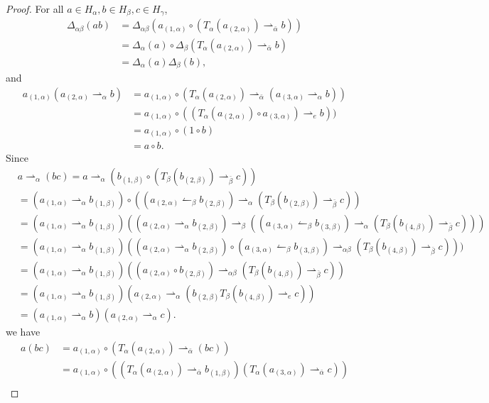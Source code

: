 \documentclass[11pt]{article}
\def\a{\alpha}
\def\b{\beta}
\def\g{\gamma}
\begin{document}
\begin{proof}
For all $a\in H_\a,b\in H_\b,c\in H_\g$,
\begin{align*}
\Delta_{\a\b}(ab)&=\Delta_{\a\b}(a_{(1,\a)}\circ(T_\a(a_{(2,\a)})\rightharpoonup_{\bar{\a}}b))\\
&=\Delta_\a(a)\circ\Delta_\b(T_\a(a_{(2,\a)})\rightharpoonup_{\bar{\a}}b)\\
&=\Delta_\a(a)\Delta_\b(b),
\end{align*}
and
\begin{align*}
a_{(1,\a)}(a_{(2,\a)}\rightharpoonup_{\a}b)&=a_{(1,\a)}\circ(T_\a(a_{(2,\a)})\rightharpoonup_{\bar{\a}}(a_{(3,\a)}\rightharpoonup_{\a}b))\\
&=a_{(1,\a)}\circ((T_\a(a_{(2,\a)})\circ a_{(3,\a)})\rightharpoonup_{e}b))\\
&=a_{(1,\a)}\circ(1\circ b)\\
&=a\circ b.
\end{align*}
Since
\begin{align*}
&a\rightharpoonup_\a(bc)=a\rightharpoonup_\a(b_{(1,\b)}\circ(T_\b(b_{(2,\b)})\rightharpoonup_{\bar{\b}}c))\\
&=(a_{(1,\a)}\rightharpoonup_\a b_{(1,\b)})\circ((a_{(2,\a)}\leftharpoonup_\b b_{(2,\b)})\rightharpoonup_\a(T_\b(b_{(2,\b)})\rightharpoonup_{\bar{\b}}c))\\
&=(a_{(1,\a)}\rightharpoonup_\a b_{(1,\b)})((a_{(2,\a)}\rightharpoonup_\a b_{(2,\b)})\rightharpoonup_\b((a_{(3,\a)}\leftharpoonup_\b b_{(3,\b)})\rightharpoonup_\a(T_\b(b_{(4,\b)})\rightharpoonup_{\bar{\b}}c)))\\
&=(a_{(1,\a)}\rightharpoonup_\a b_{(1,\b)})((a_{(2,\a)}\rightharpoonup_\a b_{(2,\b)})\circ(a_{(3,\a)}\leftharpoonup_\b b_{(3,\b)})\rightharpoonup_{\a\b}(T_\b(b_{(4,\b)})\rightharpoonup_{\bar{\b}}c)))\\
&=(a_{(1,\a)}\rightharpoonup_\a b_{(1,\b)})((a_{(2,\a)}\circ b_{(2,\b)})\rightharpoonup_{\a\b}(T_\b(b_{(4,\b)})\rightharpoonup_{\bar{\b}}c))\\
&=(a_{(1,\a)}\rightharpoonup_\a b_{(1,\b)})(a_{(2,\a)} \rightharpoonup_{\a}(b_{(2,\b)}T_\b(b_{(4,\b)})\rightharpoonup_{e}c))\\
&=(a_{(1,\a)}\rightharpoonup_\a b)(a_{(2,\a)}\rightharpoonup_\a c).
\end{align*}
we have
\begin{align*}
a(bc)&=a_{(1,\a)}\circ(T_\a(a_{(2,\a)})\rightharpoonup_{\bar{\a}}(bc))\\
&=a_{(1,\a)}\circ((T_\a(a_{(2,\a)})\rightharpoonup_{\bar{\a}}b_{(1,\b)})(T_\a(a_{(3,\a)})\rightharpoonup_{\bar{\a}}c))\\

\end{align*}
\end{proof}
\end{document}

